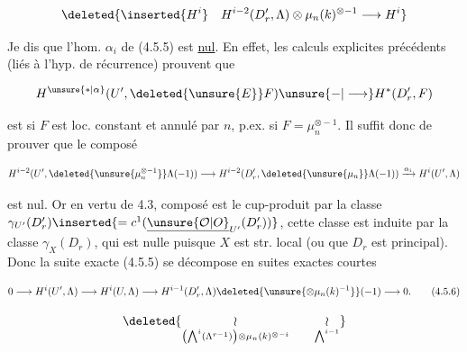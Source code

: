 
\[
\deleted{\inserted{H^i}\quad H^{i-2}(D'_r,\Lambda)\otimes\mu_n(k)^{\otimes-1}\longrightarrow H^i}
\]

 Je dis que l'hom. $\alpha_i$ de (4.5.5) est \uline{nul}. En effet, les calculs explicites précédents (liés à l'hyp. de récurrence) prouvent que

\[
H^{\unsure{*|\alpha}}(U',\deleted{\unsure{E}}F)\unsure{{-}|\longrightarrow}H^*(D'_r,F)
\]

est   si $F$ est loc. constant et annulé par $n$, p.ex. si $F=\mu_n^{\otimes-1}$. Il suffit donc de prouver que le composé

\[
H^{i-2}(U',\deleted{\unsure{\mu_n^{\otimes-1}}}\Lambda(-1))\longrightarrow H^{i-2}(D'_r,\deleted{\unsure{\mu_n}}\Lambda(-1))\xrightarrow{\alpha_i}H^i(U',\Lambda)
\]

est nul. Or en vertu de 4.3,  composé est le cup-produit par la classe  $\gamma_{U'}(D'_r)\inserted{=c^1(\underline{\unsure{\mathcal O|O}}_{U'}(D'_r))}$,  cette classe est induite par la classe  $\gamma_X(D_r)$, qui est nulle puisque $X$ est str. local (ou  que $D_r$ est principal). Donc la suite exacte (4.5.5) se décompose en suites exactes courtes

\[
0\longrightarrow H^i(U',\Lambda)\longrightarrow H^i(U,\Lambda)\longrightarrow H^{i-1}(D'_r,\Lambda)\deleted{\unsure{\otimes\mu_n(k)^{-1}}}(-1)\longrightarrow0.
\tag*{(4.5.6)}
\]

\[
\deleted{\underset{\left(\bigwedge^i(\Lambda^{r-1})\right)\otimes\mu_n(k)^{\otimes-i}}{\wr}\qquad\underset{\bigwedge^{i-1}}{\wr}}
\]

